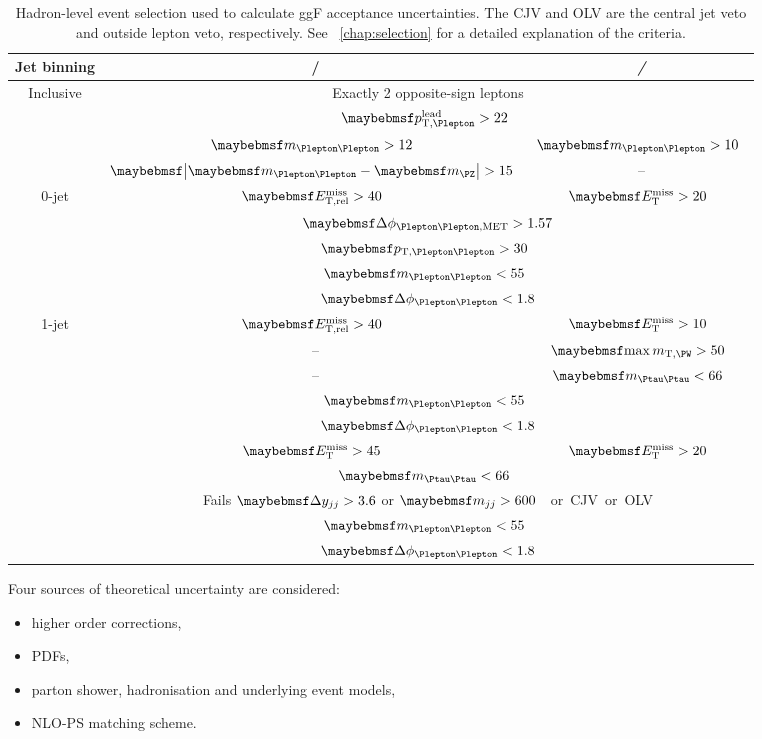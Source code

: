 \begin{table}
	\begin{tabular}{ccc}
		Jet binning & \ee/\mm & \em/\me \\
		\hline
		Inclusive & \multicolumn{2}{c}{Exactly 2 opposite-sign leptons} \\
		& \multicolumn{2}{c}{\unit{$\ptleadlep > 22$}{\GeV}} \\
		& \unit{$\mll > 12$}{\GeV} & \unit{$\mll > 10$}{\GeV} \\
		& \unit{$\mods{\mll - \mZ} > 15$}{\GeV} & -- \\
		\hline
		0-jet & \unit{$\metrel > 40$}{\GeV} & \unit{$\met > 20$}{\GeV} \\
		& \multicolumn{2}{c}{$\dphillmet > 1.57$} \\
		& \multicolumn{2}{c}{\unit{$\ptll > 30$}{\GeV}} \\
		& \multicolumn{2}{c}{\unit{$\mll < 55$}{\GeV}} \\
		& \multicolumn{2}{c}{$\dphill < 1.8$} \\
		\hline
		1-jet & \unit{$\metrel > 40$}{\GeV} & \unit{$\met > 10$}{\GeV} \\
		& -- & \unit{$\maxmtw > 50$}{\GeV} \\
		& -- & \unit{$\mtautau < 66$}{\GeV} \\
		& \multicolumn{2}{c}{\unit{$\mll < 55$}{\GeV}} \\
		& \multicolumn{2}{c}{$\dphill < 1.8$} \\
		\hline
		\twojet & \unit{$\met > 45$}{\GeV} & \unit{$\met > 20$}{\GeV} \\
		& \multicolumn{2}{c}{\unit{$\mtautau < 66$}{\GeV}} \\
		& \multicolumn{2}{c}{Fails $\dyjj > 3.6$ or \unit{$\mjj > 600$}{\GeV} or CJV or OLV} \\
		& \multicolumn{2}{c}{\unit{$\mll < 55$}{\GeV}} \\
		& \multicolumn{2}{c}{$\dphill < 1.8$} \\
	\end{tabular}
	\caption{Hadron-level event selection used to calculate ggF acceptance uncertainties. 
	The CJV and OLV are the central jet veto and outside lepton veto, respectively. See 
	\Chapter~\ref{chap:selection} for a detailed explanation of the criteria.}
	\label{tab:signal:acc_truthselection}
\end{table}

Four sources of theoretical uncertainty are considered:
\begin{itemize}[noitemsep,nolistsep]
	\item higher order corrections,
	\item \acp{PDF},
	\item parton shower, hadronisation and underlying event models,
	\item NLO-PS matching scheme.
\end{itemize}

